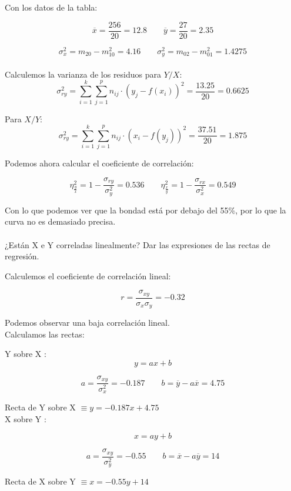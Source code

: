 Con los datos de la tabla:

$$\overline{x} = \dfrac{256}{20} = 12.8 \qquad \overline{y} = \dfrac{27}{20} = 2.35 $$

$$ \sigma_x^2 = m_{20} - m_{10}^2= 4.16 \qquad \sigma_y^2 = m_{02} - m_{01}^2= 1.4275 $$ \\

Calculemos la varianza de los residuos para $Y/X$:
$$\sigma_{ry}^2 = \sum_{i=1}^{k}\sum_{j=1}^p n_{ij}\cdot(y_j-f(x_i))^2 = \dfrac{13.25}{20} = 0.6625 $$

Para $X/Y$:
$$\sigma_{ry}^2 = \sum_{i=1}^{k}\sum_{j=1}^p n_{ij}\cdot(x_i-f(y_j))^2 = \dfrac{37.51}{20} = 1.875 $$

Podemos ahora calcular el coeficiente de correlación:

$$\eta_{\frac{y}{x}}^2 = 1 - \dfrac{\sigma_{ry}}{\sigma_y^2} = 0.536 \qquad 
\eta_{\frac{x}{y}}^2 = 1 - \dfrac{\sigma_{rx}}{\sigma_x^2} = 0.549 $$

Con lo que podemos ver que la bondad está por debajo del 55\%, por lo que la curva no es demasiado precisa. \\
\\

\subproblem 
¿Están X e Y correladas linealmente? Dar las expresiones de las rectas de regresión.

Calculemos el coeficiente de correlación lineal:

$$r =  \dfrac{\sigma_{xy}}{\sigma_x \sigma_y} = -0.32$$

Podemos observar una baja correlación lineal.\\

Calculamos las rectas:

Y sobre X : 
$$y = ax + b$$

$$a = \dfrac{\sigma_{xy}}{\sigma_x^2} = -0.187 \qquad b = \overline{y} - a\overline{x} = 4.75 $$

Recta de Y sobre X $\equiv y = -0.187x + 4.75$\\

X sobre Y :

$$x = ay + b$$

$$a = \dfrac{\sigma_{xy}}{\sigma_y^2} = -0.55 \qquad b = \overline{x} - a\overline{y} = 14 $$

Recta de X sobre Y $\equiv x = -0.55y + 14$ 
